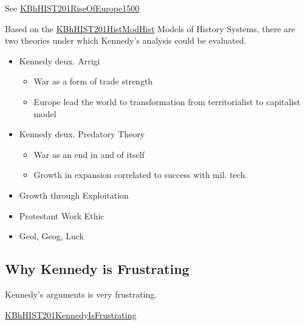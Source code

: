 \documentclass[letterpaper]{article}
\begin{document}
See \href{KBhHIST201RiseOfEurope1500.org}{KBhHIST201RiseOfEurope1500}

Based on the \href{KBhHIST201HistModHist.org}{KBhHIST201HistModHist}
Models of History Systems, there are two theories under which Kennedy's
analysis could be evaluated.

\begin{itemize}
\item Kennedy deux. Arrigi

\begin{itemize}
\item War as a form of trade strength
\item Europe lead the world to transformation from territorialist to
capitalist model
\end{itemize}

\item Kennedy deux. Predatory Theory

\begin{itemize}
\item War as an end in and of itself
\item Growth in expansion correlated to success with mil. tech.
\end{itemize}

\item Growth through Exploitation
\item Protestant Work Ethic
\item Geol, Geog, Luck
\end{itemize}

\subsection{Why Kennedy is Frustrating}
\label{sec:orge32165e}
Kennedy's arguments is very frustrating.

\href{KBhHIST201KennedyIsFrustrating.org}{KBhHIST201KennedyIsFrustrating}
\end{document}
